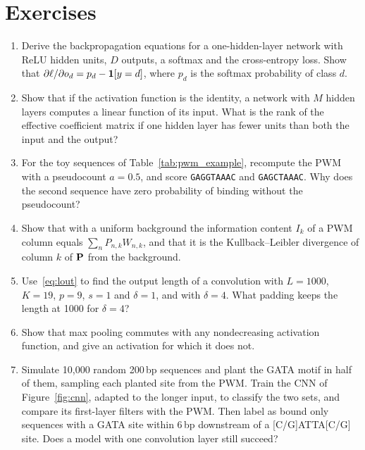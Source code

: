 \section*{Exercises}

\begin{enumerate}
  \item Derive the backpropagation equations for a one-hidden-layer network with ReLU hidden units, $D$ outputs, a softmax and the cross-entropy loss. Show that $\partial\ell/\partial o_d=p_d-\mathbf{1}[y=d]$, where $p_d$ is the softmax probability of class $d$.
  \item Show that if the activation function is the identity, a network with $M$ hidden layers computes a linear function of its input. What is the rank of the effective coefficient matrix if one hidden layer has fewer units than both the input and the output?
  \item For the toy sequences of Table~\ref{tab:pwm_example}, recompute the PWM with a pseudocount $a=0.5$, and score \texttt{GAGGTAAAC} and \texttt{GAGCTAAAC}. Why does the second sequence have zero probability of binding without the pseudocount?
  \item Show that with a uniform background the information content $I_k$ of a PWM column equals $\sum_nP_{n,k}W_{n,k}$, and that it is the Kullback--Leibler divergence of column $k$ of $\mathbf{P}$ from the background.
  \item Use~\eqref{eq:lout} to find the output length of a convolution with $L=1000$, $K=19$, $p=9$, $s=1$ and $\delta=1$, and with $\delta=4$. What padding keeps the length at 1000 for $\delta=4$?
  \item Show that max pooling commutes with any nondecreasing activation function, and give an activation for which it does not.
  \item Simulate 10{,}000 random 200\,bp sequences and plant the GATA motif in half of them, sampling each planted site from the PWM. Train the CNN of Figure~\ref{fig:cnn}, adapted to the longer input, to classify the two sets, and compare its first-layer filters with the PWM. Then label as bound only sequences with a GATA site within 6\,bp downstream of a [C/G]ATTA[C/G] site. Does a model with one convolution layer still succeed?
\end{enumerate}
